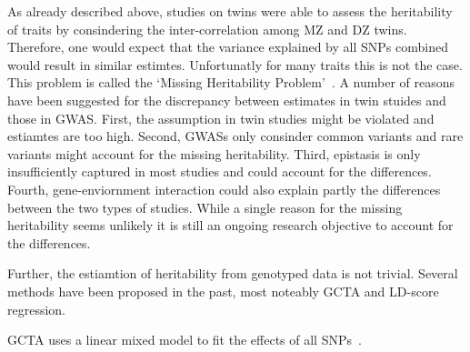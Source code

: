 As already described above, studies on twins were able to assess the heritability of traits by consindering the inter-correlation among MZ and DZ twins.
Therefore, one would expect that the variance explained by all SNPs combined would result in similar estimtes.
Unfortunatly for many traits this is not the case.
This problem is called the `Missing Heritability Problem'~\cite{Vineis2010}.
A number of reasons have been suggested for the discrepancy between estimates in twin stuides and those in GWAS\@.
First, the assumption in twin studies might be violated and estiamtes are too high.
Second, GWASs only consinder common variants and rare variants might account for the missing heritability.
Third, epistasis is only insufficiently captured in most studies and could account for the differences.
Fourth, gene-enviornment interaction could also explain partly the differences between the two types of studies.
While a single reason for the missing heritability seems unlikely it is still an ongoing research objective to account for the differences.

Further, the estiamtion of heritability from genotyped data is not trivial.
Several methods have been proposed in the past, most noteably GCTA and LD-score regression.

GCTA uses a linear mixed model to fit the effects of all SNPs~\cite{Yang2011}.

